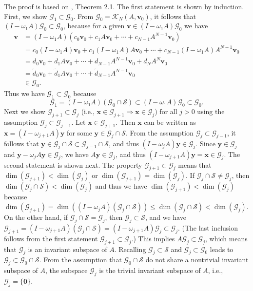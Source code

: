 \begin{Proof}
{The proof is based on , Theorem 2.1.}
{The first statement is shown by induction. First, we show $\mathcal G_1\subset\mathcal G_0$. From $\mathcal G_0=\mathcal K_N(A,\bm v_0)$, it follows that $(I-\omega_1A)\mathcal G_0\subset\mathcal G_0$, because for a given $\bm v\in(I-\omega_1A)\mathcal G_0$ we have}
\[\begin{aligned}\bm v&=(I-\omega_1A)(c_0\bm v_0+c_1A\bm v_0+\cdots+c_{N-1}A^{N-1}\bm v_0)\\&=c_0(I-\omega_1A)\bm v_0+c_1(I-\omega_1A)A\bm v_0+\cdots+c_{N-1}(I-\omega_1A)A^{N-1}\bm v_0\\&=d_0\bm v_0+d_1A\bm v_0+\cdots+d_{N-1}A^{N-1}\bm v_0+d_NA^N\bm v_0\\&=\widetilde d_0\bm v_0+\widetilde d_1A\bm v_0+\cdots+\widetilde d_{N-1}A^{N-1}\bm v_0\\&\in\mathcal G_0.\end{aligned}\]
{Thus we have $\mathcal G_1\subset\mathcal G_0$ because}
\[\mathcal G_1=(I-\omega_1A)(\mathcal G_0\cap\mathcal S)\subset(I-\omega_1A)\mathcal G_0\subset\mathcal G_0.\]
{Next we show $\mathcal G_{j+1}\subset\mathcal G_j$ (i.e., $\bm x\in\mathcal G_{j+1}\Rightarrow\bm x\in\mathcal G_j$) for all $j>0$ using the assumption $\mathcal G_j\subset\mathcal G_{j-1}$. Let $\bm x\in\mathcal G_{j+1}$. Then $\bm x$ can be written as $\bm x=(I-\omega_{j+1}A)\bm y$ for some $\bm y\in\mathcal G_j\cap\mathcal S$. From the assumption $\mathcal G_j\subset\mathcal G_{j-1}$, it follows that $\bm y\in\mathcal G_j\cap\mathcal S\subset\mathcal G_{j-1}\cap\mathcal S$, and thus $(I-\omega_jA)\bm y\in\mathcal G_j$. Since $\bm y\in\mathcal G_j$ and $\bm y-\omega_jA\bm y\in\mathcal G_j$, we have $A\bm y\in\mathcal G_j$, and thus $(I-\omega_{j+1}A)\bm y=\bm x\in\mathcal G_j$.}
{The second statement is shown next. The property $\mathcal G_{j+1}\subset\mathcal G_j$ means that $\dim(\mathcal G_{j+1})<\dim(\mathcal G_j)$ or $\dim(\mathcal G_{j+1})=\dim(\mathcal G_j)$.}
{If $\mathcal G_j\cap\mathcal S\ne\mathcal G_j$, then $\dim(\mathcal G_j\cap\mathcal S)<\dim(\mathcal G_j)$ and thus we have $\dim(\mathcal G_{j+1})<\dim(\mathcal G_j)$ because $\dim(\mathcal G_{j+1})=\dim((I-\omega_jA)(\mathcal G_j\cap\mathcal S))\le\dim(\mathcal G_j\cap\mathcal S)<\dim(\mathcal G_j)$.}
{On the other hand, if $\mathcal G_j\cap\mathcal S=\mathcal G_j$, then $\mathcal G_j\subset\mathcal S$, and we have $\mathcal G_{j+1}=(I-\omega_{j+1}A)(\mathcal G_j\cap\mathcal S)=(I-\omega_{j+1}A)\mathcal G_j\subset\mathcal G_j$. (The last inclusion follows from the first statement $\mathcal G_{j+1}\subset\mathcal G_j$.) This implies $A\mathcal G_j\subset\mathcal G_j$, which means that $\mathcal G_j$ is an invariant subspace of $A$. Recalling $\mathcal G_j\subset\mathcal S$ and $\mathcal G_j\subset\mathcal G_0$ leads to $\mathcal G_j\subset\mathcal G_0\cap\mathcal S$. From the assumption that $\mathcal G_0\cap\mathcal S$ do not share a nontrivial invariant subspace of $A$, the subspace $\mathcal G_j$ is the trivial invariant subspace of $A$, i.e., $\mathcal G_j=\{\bm0\}$.}

\end{Proof}
